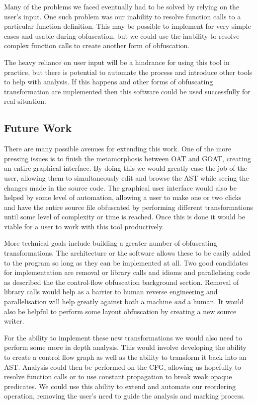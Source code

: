 \documentclass[twoside,a4paper]{report}
\begin{document}
Many of the problems we faced eventually had to be solved by relying on the user's input. One such problem was our inability to resolve function calls to a
particular function definition. This may be possible to implement for very simple cases and usable during obfuscation, but we could use the inability to
resolve complex function calls to create another form of obfuscation.

The heavy reliance on user input will be a hindrance for using this tool in practice, but there is potential to automate the process and introduce other
tools to help with analysis. If this happens and other forms of obfuscating transformation are implemented then this software could be used successfully
for real situation.

\subsection{Future Work}

There are many possible avenues for extending this work. One of the more pressing issues is to finish the metamorphosis between OAT and GOAT, creating an entire
graphical interface. By doing this we would greatly ease the job of the user, allowing them to simultaneously edit and browse the AST while seeing the changes
made in the source code. The graphical user interface would also be helped by some level of automation, allowing a user to make one or two clicks and have the
entire source file obfuscated by performing different transformations until some level of complexity or time is reached. Once this is done it would be viable
for a user to work with this tool productively.

More technical goals include building a greater number of obfuscating transformations. The architecture or the software allows these to be easily
added to the program so long as they can be implemented at all. Two good candidates for implementation are removal or library calls and idioms and
parallelising code as described the the control-flow obfuscation background section. Removal of library calls would help as a barrier to human reverse
engineering and parallelisation will help greatly against both a machine \textit{and} a human. It would also be helpful to perform some layout obfuscation
by creating a new source writer.

For the ability to implement these new transformations we would also need to perform some more in depth analysis. This would involve developing the ability
to create a control flow graph as well as the ability to transform it back into an AST. Analysis could then be performed on the CFG, allowing us hopefully
to resolve function calls or to use constant propagation to break weak opaque predicates. We could use this ability to extend and automate our reordering
operation, removing the user's need to guide the analysis and marking process.
\end{document}
